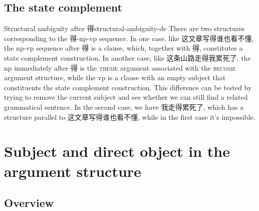 \documentclass[UTF8, a4paper, oneside, scheme=plain]{ctexrep}
\newcommand*{\category}[1]{\textsc{#1}}
\begin{document}
\subsection{The state complement}

\begin{infobox}{Structural ambiguity after 得}{structural-ambiguity-de}
    There are two structures corresponding to the 得-\acs{np}-\acs{vp} sequence.
    In one case, like 这文章写得谁也看不懂, the \acs{np}-\acs{vp} sequence after 得 is a clause, 
    which, together with 得, constitutes 
    a state complement construction.
    In another case, like 这条山路走得我累死了, 
    the \acs{np} immediately after 得 
    is the \category{theme} argument associated with the \category{become} argument structure, 
    while the \acs{vp} is a clause with an empty subject 
    that constituents the state complement construction.
    This difference can be tested by trying to remove the current subject 
    and see whether we can still find a related grammatical sentence. 
    In the second case, we have 我走得累死了, 
    which has a structure parallel to 这文章写得谁也看不懂, 
    while in the first case it's impossible. 
\end{infobox}

\section{Subject and direct object in the argument structure}

\subsection{Overview}
\end{document}
